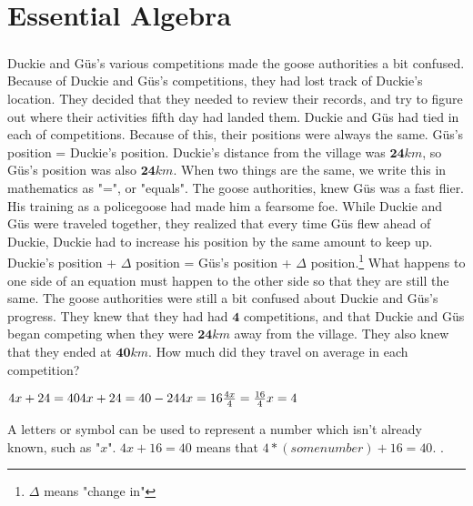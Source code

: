 \chapter{Essential Algebra}
\paragraph{} Duckie and Güs's various competitions made the goose authorities a bit confused. Because of Duckie and Güs's competitions, they had lost track of Duckie's location. They decided that they needed to review their records, and try to figure out where their activities fifth day had landed them. 
\vfill
\pagebreak
{Duckie and Güs had tied in each of competitions. Because of this, their positions were always the same.}
{Güs's position = Duckie's position. Duckie's distance from the village was $\mathbf{24}km$, so Güs's position was also $\mathbf{24}km$.}
{When two things are the same, we write this in mathematics as "=", or "equals".}
{}
{The goose authorities, knew Güs was a fast flier. His training as a policegoose had made him a fearsome foe. While Duckie and Güs were traveled together, they realized that every time Güs flew ahead of Duckie, Duckie had to increase his position by the same amount to keep up.}
{Duckie's position + $\Delta$ position = Güs's position + $\Delta$ position.\footnote{$\Delta$ means "change in"}}
{What happens to one side of an equation must happen to the other side so that they are still the same.}
{}
{The goose authorities were still a bit confused about Duckie and Güs's progress. They knew that they had had $\mathbf{4}$ competitions, and that Duckie and Güs began competing when they were $\mathbf{24} km$ away from the village. They also knew that they ended at $\mathbf{40} km$. How much did they travel on average in each competition?}
{\begin{center}$4x + 24 = 40 \linebreak 4x + 24 = 40 - 24 \linebreak 4x = 16 \linebreak \frac{4x}{4} = \frac{16}{4} \linebreak x = 4  $\end{center}}
{A letters or symbol can be used to represent a number which isn’t already known, such as "$x$". $4x + 16 = 40$ means that $4\ast(some number) + 16 = 40$.}
{}.